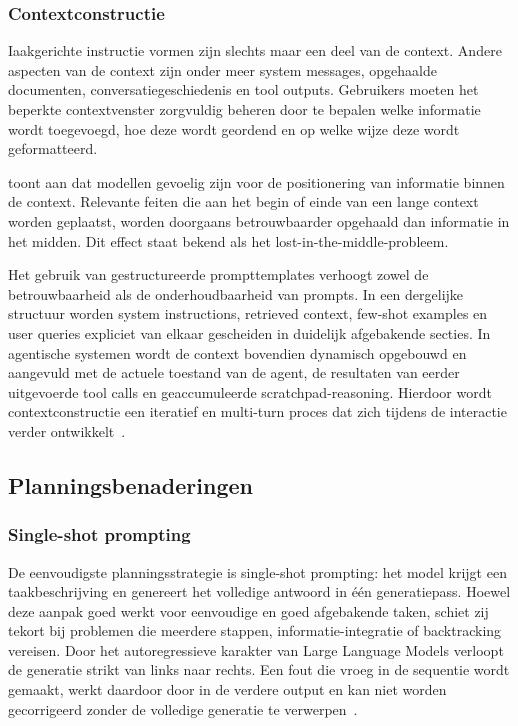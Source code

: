 \subsubsection{Contextconstructie}\label{subsec:Context Construction}

Iaakgerichte instructie vormen zijn slechts maar een deel van de context. Andere aspecten van de context zijn onder meer system messages, opgehaalde documenten, conversatiegeschiedenis en tool outputs. Gebruikers moeten het beperkte contextvenster zorgvuldig beheren door te bepalen welke informatie wordt toegevoegd, hoe deze wordt geordend en op welke wijze deze wordt geformatteerd.

\cite{zhou2025prompt} toont aan dat modellen gevoelig zijn voor de positionering van informatie binnen de context. Relevante feiten die aan het begin of einde van een lange context worden geplaatst, worden doorgaans betrouwbaarder opgehaald dan informatie in het midden. Dit effect staat bekend als het lost-in-the-middle-probleem.

Het gebruik van gestructureerde prompttemplates verhoogt zowel de betrouwbaarheid als de onderhoudbaarheid van prompts. In een dergelijke structuur worden system instructions, retrieved context, few-shot examples en user queries expliciet van elkaar gescheiden in duidelijk afgebakende secties. In agentische systemen wordt de context bovendien dynamisch opgebouwd en aangevuld met de actuele toestand van de agent, de resultaten van eerder uitgevoerde tool calls en geaccumuleerde scratchpad-reasoning. Hierdoor wordt contextconstructie een iteratief en multi-turn proces dat zich tijdens de interactie verder ontwikkelt~\cite{zhou2025prompt}.


\subsection{Planningsbenaderingen}\label{subsec:planning}

\subsubsection{Single-shot prompting}

De eenvoudigste planningsstrategie is single-shot prompting: het model krijgt een taakbeschrijving en genereert het volledige antwoord in één generatiepass. Hoewel deze aanpak goed werkt voor eenvoudige en goed afgebakende taken, schiet zij tekort bij problemen die meerdere stappen, informatie-integratie of backtracking vereisen. Door het autoregressieve karakter van Large Language Models verloopt de generatie strikt van links naar rechts. Een fout die vroeg in de sequentie wordt gemaakt, werkt daardoor door in de verdere output en kan niet worden gecorrigeerd zonder de volledige generatie te verwerpen~\cite{yao2023tot}.

